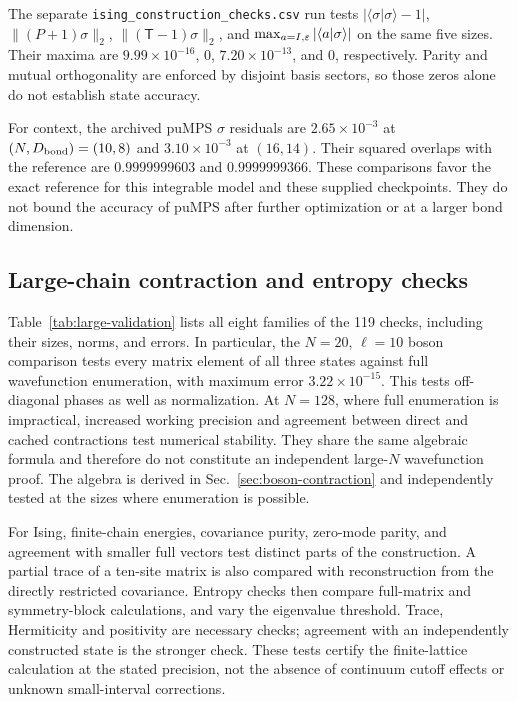 The separate \texttt{ising\_construction\_checks.csv} run tests
$|\langle\sigma|\sigma\rangle-1|$,
$\|(P+1)\sigma\|_2$, $\|(\mathsf T-1)\sigma\|_2$, and
$\max_{a=I,\varepsilon}|\langle a|\sigma\rangle|$ on the same five sizes.
Their maxima are $9.99\times10^{-16}$, $0$,
$7.20\times10^{-13}$, and $0$, respectively. Parity and mutual
orthogonality are enforced by disjoint basis sectors, so those zeros
alone do not establish state accuracy.

For context, the archived puMPS $\sigma$ residuals are
$2.65\times10^{-3}$ at $(N,D_{\rm bond})=(10,8)$ and
$3.10\times10^{-3}$ at $(16,14)$. Their squared overlaps with the
reference are $0.9999999603$ and $0.9999999366$.
These comparisons favor the exact reference for this integrable model
and these supplied checkpoints. They do not bound the accuracy of
puMPS after further optimization or at a larger bond dimension.

\subsection{Large-chain contraction and entropy checks}
\label{sec:large-sanity}


Table~\ref{tab:large-validation} lists all eight families of the 119 checks, including
their sizes, norms, and errors. In particular, the $N=20$,
$\ell=10$ boson comparison tests every matrix element of all three
states against full wavefunction enumeration, with maximum error
$3.22\times10^{-15}$. This tests off-diagonal phases as well as
normalization. At $N=128$, where full enumeration is impractical,
increased working precision and agreement between direct and cached
contractions test numerical stability. They share the same algebraic
formula and therefore do not constitute an independent large-$N$
wavefunction proof. The algebra is derived in Sec.~\ref{sec:boson-contraction} and independently
tested at the sizes where enumeration is possible.

For Ising, finite-chain energies, covariance purity, zero-mode parity,
and agreement with smaller full vectors test distinct parts of the
construction. A partial trace of a ten-site matrix is also compared
with reconstruction from the directly restricted covariance. Entropy
checks then compare full-matrix and symmetry-block calculations, and
vary the eigenvalue threshold. Trace, Hermiticity and positivity are
necessary checks; agreement with an independently constructed state
is the stronger check. These tests certify the finite-lattice
calculation at the stated precision, not the absence of continuum
cutoff effects or unknown small-interval corrections.

